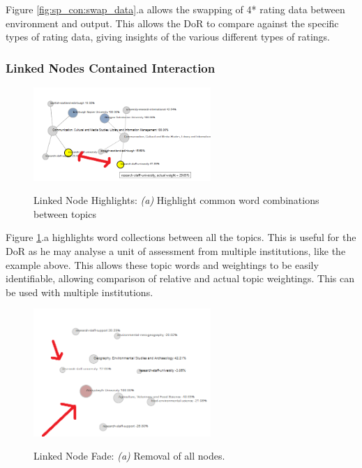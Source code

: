 \documentclass[a4paper, 11pt]{article}
\begin{document}
\noindent Figure \ref{fig:sp_con:swap_data}.a allows the swapping of 4* rating data between environment and output. This allows the DoR to compare against the specific types of rating data, giving insights of the various different types of ratings.


\subsubsection{Linked Nodes Contained Interaction}
\begin{figure}[hbt!]
	\centering
      \includegraphics[width=0.6\textwidth]{imgs/ln_int/topic_weight_highlight.png} \\
	\caption{Linked Node Highlights: 
	\textit{(a)} Highlight common word combinations between topics}
    \label{fig:lp_con:common_topic_words}
     \noindent\makebox[\linewidth]{\rule{\textwidth}{0.4pt}}
\end{figure}

\noindent Figure \ref{fig:lp_con:common_topic_words}.a highlights word collections between all the topics. This is useful for the DoR as he may analyse a unit of assessment from multiple institutions, like the example above. This allows these topic words and weightings to be easily identifiable, allowing comparison of relative and actual topic weightings. This can be used with multiple institutions. \\


\begin{figure}[hbt!]
	\centering
      \includegraphics[width=0.6\textwidth]{imgs/ln_int/remove_nodes.png} \\
	\caption{Linked Node Fade: 
	\textit{(a)} Removal of all nodes.}
    \label{fig:lp_con:remove_nodes}
     \noindent\makebox[\linewidth]{\rule{\textwidth}{0.4pt}}
\end{figure}
\end{document}
